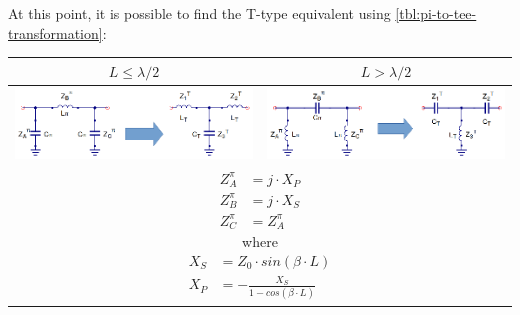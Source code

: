 \noindent At this point, it is possible to find the T-type equivalent using \ref{tbl:pi-to-tee-transformation}:

\begin{table}[H]
  \centering
  \begin{tabular}{ | c | c | }
    \hline
    $L \leq \lambda/2$ & $L > \lambda/2$\\ \hline
    \begin{minipage}{.4\textwidth}
      \includegraphics[width=\linewidth]{./images/Synthesis/Impedance_Matching/TL-circuit-equivalent-LP-Pi-Tee}
    \end{minipage}
    &
    \begin{minipage}{.4\textwidth}
      \includegraphics[width=\linewidth]{./images/Synthesis/Impedance_Matching/TL-circuit-equivalent-HP-Pi-Tee}
    \end{minipage}
\\ \hline
    \multicolumn{2}{|c|}{
    \begin{minipage}{.4\textwidth}
         { \begin{align}
              Z_A^{\pi} &= j \cdot X_P\\
              Z_B^{\pi} &= j \cdot X_S \\
              Z_C^{\pi} &= Z_A^{\pi} 
         \end{align}
        \noindent where
        \begin{align}
              X_S &= Z_0 \cdot sin(\beta \cdot L)\\
              X_P &= -\frac{X_S}{1 - cos(\beta \cdot L)}
         \end{align}
       }\end{minipage}}
\\ \hline

\end{tabular}
\end{table}
